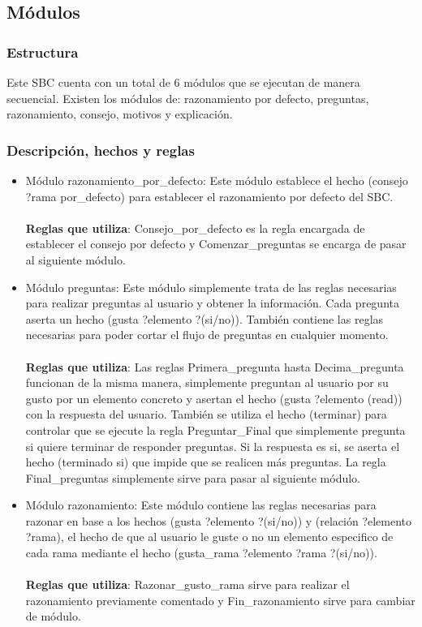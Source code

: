 \subsection{Módulos}
\subsubsection{Estructura}
Este SBC cuenta con un total de 6 módulos que se ejecutan de manera secuencial. Existen los módulos de: razonamiento por defecto, preguntas, razonamiento, consejo, motivos y explicación.

\subsubsection{Descripción, hechos y reglas}
\begin{itemize}
   \item Módulo razonamiento\_por\_defecto: Este módulo establece el hecho (consejo ?rama por\_defecto) para establecer el razonamiento por defecto del SBC.
   \\\\
   \textbf{Reglas que utiliza}: Consejo\_por\_defecto es la regla encargada de establecer el consejo por defecto y Comenzar\_preguntas se encarga de pasar al siguiente módulo.

   \item Módulo preguntas: Este módulo simplemente trata de las reglas necesarias para realizar preguntas al usuario y obtener la información. Cada pregunta aserta un hecho (gusta ?elemento ?(si/no)). También contiene las reglas necesarias para poder cortar el flujo de preguntas en cualquier momento.
   \\\\
   \textbf{Reglas que utiliza}: Las reglas Primera\_pregunta hasta Decima\_pregunta funcionan de la misma manera, simplemente preguntan al usuario por su gusto por un elemento concreto y asertan el hecho (gusta ?elemento (read)) con la respuesta del usuario. También se utiliza el hecho (terminar) para controlar que se ejecute la regla Preguntar\_Final que simplemente pregunta si quiere terminar de responder preguntas. Si la respuesta es si, se aserta el hecho (terminado si) que impide que se realicen más preguntas. La regla Final\_preguntas simplemente sirve para pasar al siguiente módulo.

   \item Módulo razonamiento: Este módulo contiene las reglas necesarias para razonar en base a los hechos (gusta ?elemento ?(si/no)) y (relación ?elemento ?rama), el hecho de que al usuario le guste o no un elemento especifico de cada rama mediante el hecho (gusta\_rama ?elemento ?rama ?(si/no)).
   \\\\
   \textbf{Reglas que utiliza}: Razonar\_gusto\_rama sirve para realizar el razonamiento previamente comentado y Fin\_razonamiento sirve para cambiar de módulo.


\end{itemize}

